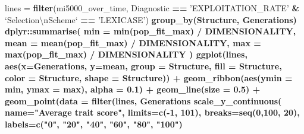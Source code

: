 \documentclass[]{book}
\newenvironment{Shaded}{\begin{snugshade}}{\end{snugshade}}
\newcommand{\CharTok}[1]{\textcolor[rgb]{0.31,0.60,0.02}{#1}}
\newcommand{\DataTypeTok}[1]{\textcolor[rgb]{0.13,0.29,0.53}{#1}}
\newcommand{\DecValTok}[1]{\textcolor[rgb]{0.00,0.00,0.81}{#1}}
\newcommand{\FloatTok}[1]{\textcolor[rgb]{0.00,0.00,0.81}{#1}}
\newcommand{\KeywordTok}[1]{\textcolor[rgb]{0.13,0.29,0.53}{\textbf{#1}}}
\newcommand{\NormalTok}[1]{#1}
\newcommand{\OperatorTok}[1]{\textcolor[rgb]{0.81,0.36,0.00}{\textbf{#1}}}
\newcommand{\StringTok}[1]{\textcolor[rgb]{0.31,0.60,0.02}{#1}}
\begin{document}
\begin{Shaded}
\begin{Highlighting}[]
\NormalTok{lines =}\StringTok{ }\KeywordTok{filter}\NormalTok{(mi5000_over_time, Diagnostic }\OperatorTok{==}\StringTok{ 'EXPLOITATION_RATE'} \OperatorTok{&}\StringTok{ `}\DataTypeTok{Selection}\CharTok{\textbackslash{}n}\DataTypeTok{Scheme}\StringTok{`} \OperatorTok{==}\StringTok{ 'LEXICASE'}\NormalTok{) }\OperatorTok{%>%}
\StringTok{  }\KeywordTok{group_by}\NormalTok{(Structure, Generations) }\OperatorTok{%>%}
\StringTok{  }\NormalTok{dplyr}\OperatorTok{::}\KeywordTok{summarise}\NormalTok{(}
    \DataTypeTok{min =} \KeywordTok{min}\NormalTok{(pop_fit_max) }\OperatorTok{/}\StringTok{ }\NormalTok{DIMENSIONALITY,}
    \DataTypeTok{mean =} \KeywordTok{mean}\NormalTok{(pop_fit_max) }\OperatorTok{/}\StringTok{ }\NormalTok{DIMENSIONALITY,}
    \DataTypeTok{max =} \KeywordTok{max}\NormalTok{(pop_fit_max) }\OperatorTok{/}\StringTok{ }\NormalTok{DIMENSIONALITY}
\NormalTok{  )}
\KeywordTok{ggplot}\NormalTok{(lines, }\KeywordTok{aes}\NormalTok{(}\DataTypeTok{x=}\NormalTok{Generations, }\DataTypeTok{y=}\NormalTok{mean, }\DataTypeTok{group =}\NormalTok{ Structure, }\DataTypeTok{fill =}\NormalTok{ Structure, }\DataTypeTok{color =}\NormalTok{ Structure, }\DataTypeTok{shape =}\NormalTok{ Structure)) }\OperatorTok{+}
\StringTok{  }\KeywordTok{geom_ribbon}\NormalTok{(}\KeywordTok{aes}\NormalTok{(}\DataTypeTok{ymin =}\NormalTok{ min, }\DataTypeTok{ymax =}\NormalTok{ max), }\DataTypeTok{alpha =} \FloatTok{0.1}\NormalTok{) }\OperatorTok{+}
\StringTok{  }\KeywordTok{geom_line}\NormalTok{(}\DataTypeTok{size =} \FloatTok{0.5}\NormalTok{) }\OperatorTok{+}
\StringTok{  }\KeywordTok{geom_point}\NormalTok{(}\DataTypeTok{data =} \KeywordTok{filter}\NormalTok{(lines, Generations }\OperatorTok{%%}\StringTok{ }\DecValTok{2000} \OperatorTok{==}\StringTok{ }\DecValTok{0}\NormalTok{), }\DataTypeTok{size =} \FloatTok{2.5}\NormalTok{, }\DataTypeTok{stroke =} \FloatTok{2.0}\NormalTok{, }\DataTypeTok{alpha =} \FloatTok{1.0}\NormalTok{) }\OperatorTok{+}
\StringTok{  }\KeywordTok{scale_y_continuous}\NormalTok{(}
    \DataTypeTok{name=}\StringTok{"Average trait score"}\NormalTok{,}
    \DataTypeTok{limits=}\KeywordTok{c}\NormalTok{(}\OperatorTok{-}\DecValTok{1}\NormalTok{, }\DecValTok{101}\NormalTok{),}
    \DataTypeTok{breaks=}\KeywordTok{seq}\NormalTok{(}\DecValTok{0}\NormalTok{,}\DecValTok{100}\NormalTok{, }\DecValTok{20}\NormalTok{),}
    \DataTypeTok{labels=}\KeywordTok{c}\NormalTok{(}\StringTok{"0"}\NormalTok{, }\StringTok{"20"}\NormalTok{, }\StringTok{"40"}\NormalTok{, }\StringTok{"60"}\NormalTok{, }\StringTok{"80"}\NormalTok{, }\StringTok{"100"}\NormalTok{)}
}}}
\end{Highlighting}
\end{Shaded}
\end{document}
